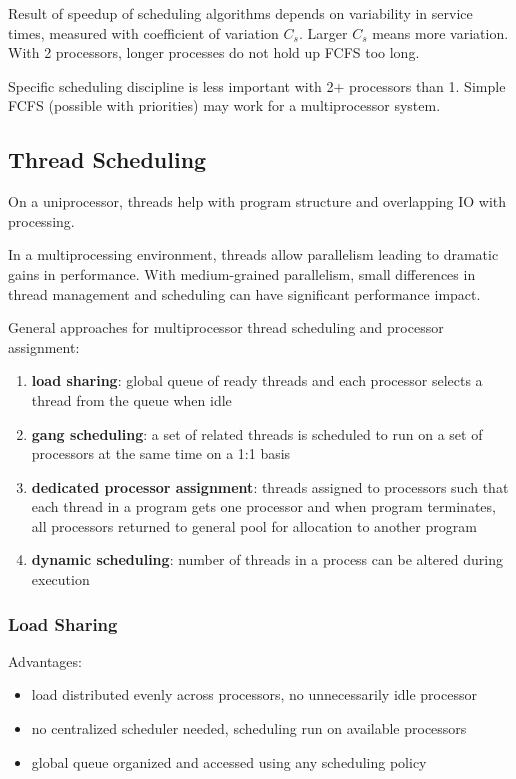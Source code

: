 \documentclass[11pt]{article}
\begin{document}
Result of speedup of scheduling algorithms depends on variability in service times,
measured with coefficient of variation \(C_{s}\).
Larger \(C_{s}\) means more variation.
With 2 processors, longer processes do not hold up FCFS too long.

Specific scheduling discipline is less important with 2+ processors than 1.
Simple FCFS (possible with priorities) may work for a multiprocessor system.
\subsection{Thread Scheduling}
\label{sec:orgc22bce9}
On a uniprocessor, threads help with program structure and overlapping IO with
processing.

In a multiprocessing environment, threads allow parallelism leading to dramatic gains
in performance. With medium-grained parallelism, small differences in thread
management and scheduling can have significant performance impact.

General approaches for multiprocessor thread scheduling and processor assignment:
\begin{enumerate}
\item \textbf{load sharing}: global queue of ready threads and each processor selects a thread
from the queue when idle
\item \textbf{gang scheduling}: a set of related threads is scheduled to run on a set of
processors at the same time on a 1:1 basis
\item \textbf{dedicated processor assignment}: threads assigned to processors such that each
thread in a program gets one processor and when program terminates, all processors
returned to general pool for allocation to another program
\item \textbf{dynamic scheduling}: number of threads in a process can be altered during execution
\end{enumerate}
\subsubsection{Load Sharing}
\label{sec:org8bb52ec}
Advantages:
\begin{itemize}
\item load distributed evenly across processors, no unnecessarily idle processor
\item no centralized scheduler needed, scheduling run on available processors
\item global queue organized and accessed using any scheduling policy
\end{itemize}
\end{document}
